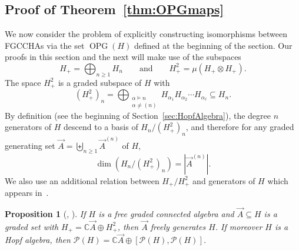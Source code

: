 \documentclass[11pt]{amsart}
\newtheorem{proposition}[theorem]{Proposition}
\theoremstyle{definition}
\numberwithin{equation}{section}
\def\CC{{\mathbb C}}
\newcommand{\FGCCHAs}{\textsf{FGCCHA}s\xspace}
\newcommand{\OPG}{\operatorname{OPG}}
\begin{document}
\subsection{Proof of Theorem~\ref{thm:OPGmaps}}
\label{sec:OPGproof}

We now consider the problem of explicitly constructing isomorphisms between \FGCCHAs via the set $\OPG(H)$ defined at the beginning of the section.  Our proofs in this section and the next will make use of the subspaces
\[
H_{+} = \bigoplus_{n \geq 1} H_n
\qquad\text{and}\qquad 
H^{2}_{+} = \mu(H_{+} \otimes H_{+}).
\]
The space $H^{2}_{+}$ is a graded subspace of $H$ with
\begin{equation}
\label{eq:Hplusdef}
(H^{2}_{+})_{n} = \bigoplus_{\substack{\alpha \vDash n \\ \alpha \neq (n)}}
H_{\alpha_{1}} H_{\alpha_{2}}\cdots H_{\alpha_{\ell}} \subseteq H_{n}.
\end{equation}
By definition (see the beginning of Section~\ref{sec:HopfAlgebra}), the degree $n$ generators of $H$ descend to a basis of $H_{n}/ (H^{2}_{+})_{n}$, and therefore for any graded generating set $\vec{A} = \biguplus_{n \ge 1} \vec{A}^{(n)}$ of $H$, 
\[
\dim(H_{n}/(H^{2}_{+})_{n}) = |\vec{A}^{(n)}|.
\]
We also use an additional relation between $H_{+}/H^{2}_{+}$ and generators of $H$ which appears in~\cite{F23}.

\begin{proposition}[{\cite[Proposition 2.2 and 2.4]{F23}}, \cite{P94}]
\label{prop:indecomposable generators}
If $H$ is a free graded connected algebra and $\vec{A} \subseteq H$ is a graded set with $H_{+} = \CC \vec{A} \oplus H_{+}^{2}$, then $\vec{A}$ freely generates $H$.  If moreover $H$ is a Hopf algebra, then $\mathcal{P}(H) = \CC \vec{A} \oplus [\mathcal{P}(H), \mathcal{P}(H)]$.
\end{proposition}
\end{document}
